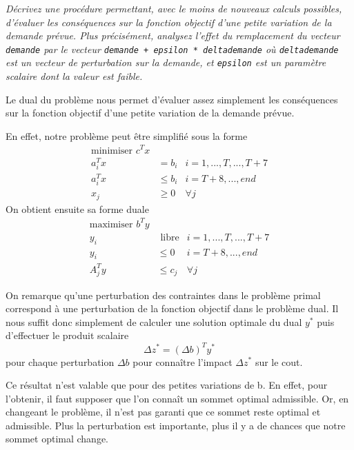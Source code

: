 \question %
\emph{Décrivez une procédure permettant, avec le moins de nouveaux calculs
possibles, d'évaluer les conséquences sur la fonction objectif d’une petite
variation de la demande prévue. Plus précisément, analysez l'effet du
remplacement du vecteur \texttt{demande}
par le vecteur \texttt{demande + epsilon * delta\textunderscore demande}
où \texttt{delta\textunderscore demande} est un vecteur de perturbation
sur la demande,
et \texttt{epsilon} est un paramètre scalaire dont la valeur est faible.}

Le dual du problème nous permet d'évaluer assez simplement
les conséquences sur la fonction objectif
d'une petite variation de la demande prévue.

En effet, notre problème peut être simplifié sous la forme
\begin{align*}
	\text{minimiser } c^T x \\
	a_i^T x &= b_i  & i = 1,...,T,...,T+7 \\
  a_i^T x &\leq b_i & i = T+8,...,end \\
	x_j &\geq 0 & \forall j
\end{align*}
On obtient ensuite sa forme duale
\begin{align*}
	\text{maximiser } b^T y \\
	y_i &\text{ libre} & i = 1,...,T,...,T+7 \\
  y_i &\leq 0 & i = T+8,...,end \\
  A_j^T y &\leq c_j & \forall j
\end{align*}

On remarque qu'une perturbation des contraintes dans le problème primal
correspond à une perturbation de la fonction objectif dans le problème dual.
Il nous suffit donc simplement de calculer une solution optimale du dual $y^{*}$
puis d'effectuer le produit scalaire
\[ \Delta z^{*} = (\Delta b)^T y^{*} \]
pour chaque perturbation $\Delta b$ pour conna\^itre l'impact $\Delta z^{*}$
sur le cout.

Ce résultat n'est valable que pour des petites variations de b.
En effet, pour l'obtenir, il faut supposer que l'on connaît un sommet optimal admissible.
Or, en changeant le problème, il n'est pas garanti que ce sommet reste optimal et admissible.
Plus la perturbation est importante, plus il y a de chances que notre sommet optimal change.
